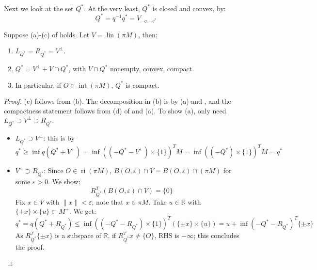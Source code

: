 \paragraph{}Next we look at the set $Q^\ast$. At the very least, $Q^\ast$ is closed and convex, by:
\[
	Q^\ast = q^{-1}q^\ast = V_{-q,-q^\ast}
\]

\begin{prop}\label{prop:032-optimal-set}
	Suppose (a)-(c) of  holds. Let $V=\operatorname{lin}(\pi M)$, then:
	\begin{enumerate}[label=(\alph*)]
		\item $L_{Q^\ast}=R_{Q^\ast}=V^\perp$.
		\item $Q^\ast = V^\perp + V\cap Q^\ast$, with $V\cap Q^\ast$ nonempty, convex, compact.
		\item In particular, if $O\in \operatorname{int}(\pi M)$, $Q^\ast$ is compact.
	\end{enumerate}
\end{prop}

\begin{proof}
	(c) follows from (b). The decomposition in (b) is by (a) and , and the compactness statement follows from (d) of  and (a). To show (a), only need $L_{Q^\ast}\supset V^\perp \supset R_{Q^\ast}$.
	\begin{itemize}
		\item $L_{Q^\ast}\supset V^\perp$: this is by
		      \[
			      q^\ast \geq \inf q(Q^\ast + V^\perp )=\inf \left((-Q^\ast - V^\perp)\times \{1\}\right)^T M = \inf \left((-Q^\ast) \times \{1\}\right)^TM = q^\ast
		      \]
		\item $V^\perp\supset R_{Q^\ast}$: Since $O\in \operatorname{ri}(\pi M)$, $B({O,\varepsilon})\cap V = B({O,\varepsilon})\cap (\pi M)$ for some $\varepsilon >0$. We show:
		      \[
			      R_{Q^\ast}^T \left(B({O,\varepsilon})\cap V\right) = \{0\}
		      \]
		      Fix $x\in V$ with $\|x\|<\varepsilon $; note that $x\in \pi M$. Take $u\in \mathbb{R}$ with $\{\pm x\}\times \{u\}\subset M^+$. We get:
		      \[
			      q^\ast = q(Q^\ast + R_{Q^\ast})\leq \inf \left(\left(-Q^\ast-R_{Q^\ast}\right)\times \{1\}\right)^T\left(\{\pm x\}\times \{u\}\right)
			      =u+\inf \left(-Q^\ast-R_{Q^\ast}\right)^T\{\pm x\}
		      \]
		      As $R_{Q^\ast}^T\{\pm x\}$ is a subspace of $\mathbb{R}$, if $R_{Q^\ast}^Tx\neq \{O\}$, RHS is $-\infty$; this concludes the proof.\qedhere
	\end{itemize}
\end{proof}

